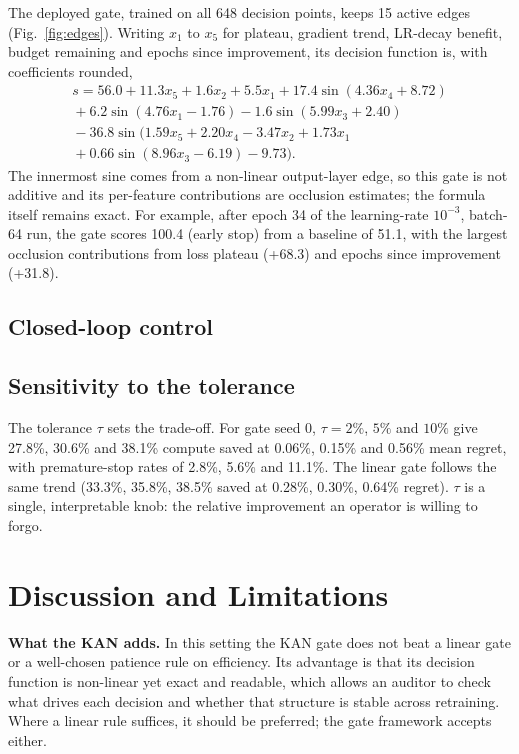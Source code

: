 \documentclass[conference]{IEEEtran}
\begin{document}
The deployed gate, trained on all 648 decision points, keeps 15 active edges (Fig.~\ref{fig:edges}). Writing $x_1$ to $x_5$ for plateau, gradient trend, LR-decay benefit, budget remaining and epochs since improvement, its decision function is, with coefficients rounded,
\begin{multline*}
s = 56.0 + 11.3x_5 + 1.6x_2 + 5.5x_1 + 17.4\sin(4.36x_4+8.72)\\
{}+ 6.2\sin(4.76x_1-1.76) - 1.6\sin(5.99x_3+2.40)\\
{}- 36.8\sin(1.59x_5+2.20x_4-3.47x_2+1.73x_1\\
{}+0.66\sin(8.96x_3-6.19)-9.73).
\end{multline*}
The innermost sine comes from a non-linear output-layer edge, so this gate is not additive and its per-feature contributions are occlusion estimates; the formula itself remains exact. For example, after epoch 34 of the learning-rate $10^{-3}$, batch-64 run, the gate scores 100.4 (early stop) from a baseline of 51.1, with the largest occlusion contributions from loss plateau (+68.3) and epochs since improvement (+31.8).

\subsection{Closed-loop control}
\label{sec:closed}


\subsection{Sensitivity to the tolerance}
The tolerance $\tau$ sets the trade-off. For gate seed 0, $\tau=2\%$, $5\%$ and $10\%$ give 27.8\%, 30.6\% and 38.1\% compute saved at 0.06\%, 0.15\% and 0.56\% mean regret, with premature-stop rates of 2.8\%, 5.6\% and 11.1\%. The linear gate follows the same trend (33.3\%, 35.8\%, 38.5\% saved at 0.28\%, 0.30\%, 0.64\% regret). $\tau$ is a single, interpretable knob: the relative improvement an operator is willing to forgo.

\section{Discussion and Limitations}
\textbf{What the KAN adds.} In this setting the KAN gate does not beat a linear gate or a well-chosen patience rule on efficiency. Its advantage is that its decision function is non-linear yet exact and readable, which allows an auditor to check what drives each decision and whether that structure is stable across retraining. Where a linear rule suffices, it should be preferred; the gate framework accepts either.
\end{document}

